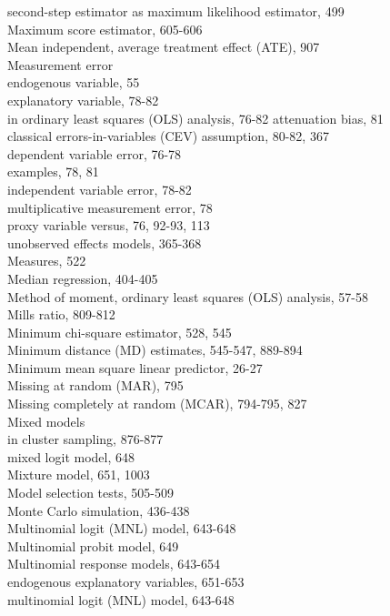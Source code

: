 \documentclass[10pt]{article}
\begin{document}
second-step estimator as maximum likelihood estimator, 499\\
Maximum score estimator, 605-606\\
Mean independent, average treatment effect (ATE), 907\\
Measurement error\\
endogenous variable, 55\\
explanatory variable, 78-82\\
in ordinary least squares (OLS) analysis, 76-82 attenuation bias, 81\\
classical errors-in-variables (CEV) assumption, 80-82, 367\\
dependent variable error, 76-78\\
examples, 78, 81\\
independent variable error, 78-82\\
multiplicative measurement error, 78\\
proxy variable versus, 76, 92-93, 113\\
unobserved effects models, 365-368\\
Measures, 522\\
Median regression, 404-405\\
Method of moment, ordinary least squares (OLS) analysis, 57-58\\
Mills ratio, 809-812\\
Minimum chi-square estimator, 528, 545\\
Minimum distance (MD) estimates, 545-547, 889-894\\
Minimum mean square linear predictor, 26-27\\
Missing at random (MAR), 795\\
Missing completely at random (MCAR), 794-795, 827\\
Mixed models\\
in cluster sampling, 876-877\\
mixed logit model, 648\\
Mixture model, 651, 1003\\
Model selection tests, 505-509\\
Monte Carlo simulation, 436-438\\
Multinomial logit (MNL) model, 643-648\\
Multinomial probit model, 649\\
Multinomial response models, 643-654\\
endogenous explanatory variables, 651-653\\
multinomial logit (MNL) model, 643-648\\
\end{document}
